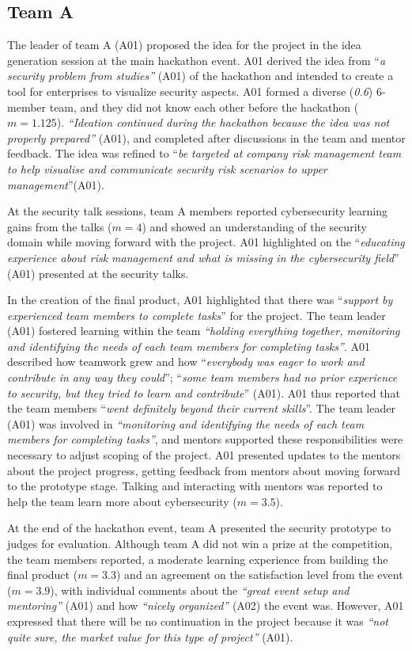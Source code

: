 \documentclass[runningheads]{llncs}
\begin{document}
\subsection{Team A}
The leader of team A (A01) proposed the idea for the project in the idea generation session at the main hackathon event. A01 derived the idea from ``\textit{a security problem from studies''} (A01) of the hackathon and intended to create a tool for enterprises to visualize security aspects. A01 formed a diverse (\textit{0.6}) 6-member team, and they did not know each other before the hackathon ($m = 1.125$).  \textit{``Ideation continued during the hackathon because the idea was not properly prepared''} (A01), and completed after discussions in the team and mentor feedback. The idea was refined to ``\textit{be targeted at company risk management team to help visualise and communicate security risk scenarios to upper management}''(A01).

At the security talk sessions, team A members reported cybersecurity learning gains from the talks ($m = 4$) and showed an understanding of the security domain while moving forward with the project. A01 highlighted on the ``\textit{educating experience about risk management and what is missing in the cybersecurity field}'' (A01) presented at the security talks.

In the creation of the final product, A01 highlighted that there was ``\textit{support by experienced team members to complete tasks}'' for the project. The team leader (A01) fostered learning within the team \textit{``holding everything together, monitoring and identifying the needs of each team members for completing tasks''}. A01 described how teamwork grew and how ``\textit{everybody was eager to work and contribute in any way they could}''; ``\textit{some team members had no prior experience to security, but they tried to learn and contribute}'' (A01). A01 thus reported that the team members ``\textit{went definitely beyond their current skills}''. The team leader (A01) was involved in  \textit{``monitoring and identifying the needs of each team members for completing tasks''}, and mentors supported these responsibilities were necessary to adjust scoping of the project. A01 presented updates to the mentors about the project progress, getting feedback from mentors about moving forward to the prototype stage. Talking and interacting with mentors was reported to help the team learn more about cybersecurity ($m = 3.5$).

At the end of the hackathon event, team A presented the security prototype to judges for evaluation. Although team A did not win a prize at the competition, the team members reported, a moderate learning experience from building the final product ($m = 3.3$) and an agreement on the satisfaction level from the event ($m = 3.9$), with individual comments about the \textit{``great event setup and mentoring''} (A01) and how \textit{``nicely organized''} (A02) the event was. However, A01 expressed that there will be no continuation in the project because it was \textit{``not quite sure, the market value for this type of project''} (A01).%
\end{document}

